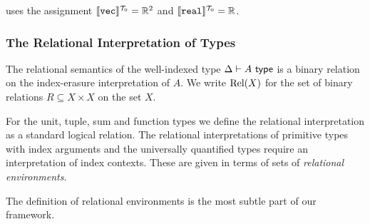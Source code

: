 \begin{example}
  uses the assignment $\llbracket \textup{\texttt{vec}} \rrbracket^{\mathcal{T}_0} = \mathbb{R}^2$ and
  $\llbracket \textup{\texttt{real}} \rrbracket^{\mathcal{T}_0} = \mathbb{R}$.
\end{example}

\subsubsection{The Relational Interpretation of Types}
\label{sec:relational-semantics}

The relational semantics of the well-indexed type
$\Delta \vdash A \textup{\textsf{ type}}$ is a binary relation on the index-erasure
interpretation of $A$. We write $\mathrm{Rel}(X)$ for the set
of binary relations $R \subseteq X \times X$ on the set $X$.

For the unit, tuple, sum and function types we define the
relational interpretation as a standard logical relation. The
relational interpretations of primitive types with index arguments and
the universally quantified types require an interpretation of index
contexts. %
These are given in terms of sets
of \emph{relational environments}.

The definition of relational environments is the most subtle part of
our framework. 


